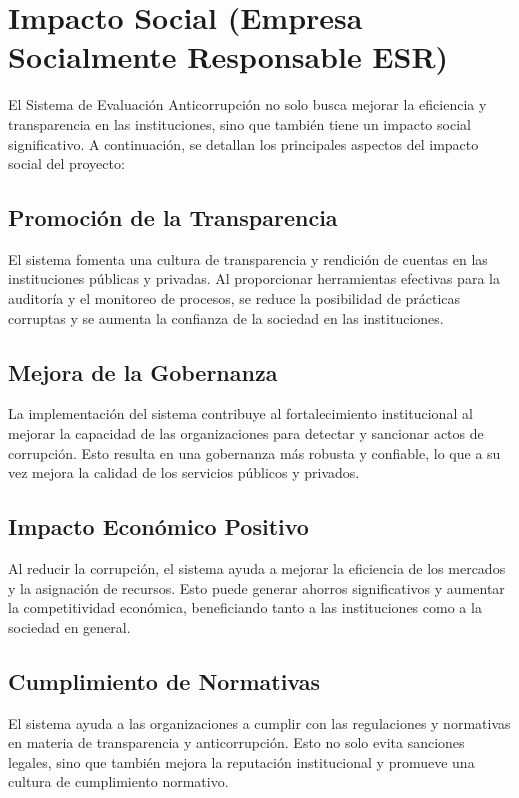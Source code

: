 \documentclass[a4paper,12pt]{article}
\begin{document}
\section{Impacto Social (Empresa Socialmente Responsable ESR)}
El Sistema de Evaluación Anticorrupción no solo busca mejorar la eficiencia y transparencia en las instituciones, sino que también tiene un impacto social significativo. A continuación, se detallan los principales aspectos del impacto social del proyecto:

\subsection{Promoción de la Transparencia}
El sistema fomenta una cultura de transparencia y rendición de cuentas en las instituciones públicas y privadas. Al proporcionar herramientas efectivas para la auditoría y el monitoreo de procesos, se reduce la posibilidad de prácticas corruptas y se aumenta la confianza de la sociedad en las instituciones.

\subsection{Mejora de la Gobernanza}
La implementación del sistema contribuye al fortalecimiento institucional al mejorar la capacidad de las organizaciones para detectar y sancionar actos de corrupción. Esto resulta en una gobernanza más robusta y confiable, lo que a su vez mejora la calidad de los servicios públicos y privados.

\subsection{Impacto Económico Positivo}
Al reducir la corrupción, el sistema ayuda a mejorar la eficiencia de los mercados y la asignación de recursos. Esto puede generar ahorros significativos y aumentar la competitividad económica, beneficiando tanto a las instituciones como a la sociedad en general.

\subsection{Cumplimiento de Normativas}
El sistema ayuda a las organizaciones a cumplir con las regulaciones y normativas en materia de transparencia y anticorrupción. Esto no solo evita sanciones legales, sino que también mejora la reputación institucional y promueve una cultura de cumplimiento normativo.
\end{document}
